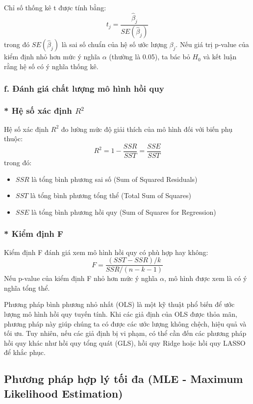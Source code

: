 Chỉ số thống kê t được tính bằng:
\begin{equation}
t_j = \frac{\hat{\beta}_j}{SE(\hat{\beta}_j)}
\end{equation}
trong đó $SE(\hat{\beta}_j)$ là sai số chuẩn của hệ số ước lượng $\beta_j$. Nếu giá trị p-value của kiểm định nhỏ hơn mức ý nghĩa $\alpha$ (thường là 0.05), ta bác bỏ $H_0$ và kết luận rằng hệ số có ý nghĩa thống kê.

\subsubsection{f. Đánh giá chất lượng mô hình hồi quy}
\subsubsection{* Hệ số xác định $R^2$}
Hệ số xác định $R^2$ đo lường mức độ giải thích của mô hình đối với biến phụ thuộc:
\begin{equation}
R^2 = 1 - \frac{SSR}{SST} = \frac{SSE}{SST}
\end{equation}
trong đó:
\begin{itemize}
    \item $SSR$ là tổng bình phương sai số (Sum of Squared Residuals)
    \item $SST$ là tổng bình phương tổng thể (Total Sum of Squares)
    \item $SSE$ là tổng bình phương hồi quy (Sum of Squares for Regression)
\end{itemize}

\subsubsection{* Kiểm định F}
Kiểm định F đánh giá xem mô hình hồi quy có phù hợp hay không:
\begin{equation}
F = \frac{(SST - SSR)/k}{SSR/(n-k-1)}
\end{equation}
Nếu p-value của kiểm định F nhỏ hơn mức ý nghĩa $\alpha$, mô hình được xem là có ý nghĩa tổng thể.


Phương pháp bình phương nhỏ nhất (OLS) là một kỹ thuật phổ biến để ước lượng mô hình hồi quy tuyến tính. Khi các giả định của OLS được thỏa mãn, phương pháp này giúp chúng ta có được các ước lượng không chệch, hiệu quả và tối ưu. Tuy nhiên, nếu các giả định bị vi phạm, có thể cần đến các phương pháp hồi quy khác như hồi quy tổng quát (GLS), hồi quy Ridge hoặc hồi quy LASSO để khắc phục.


\subsection{Phương pháp hợp lý tối đa (MLE - Maximum Likelihood Estimation)}
